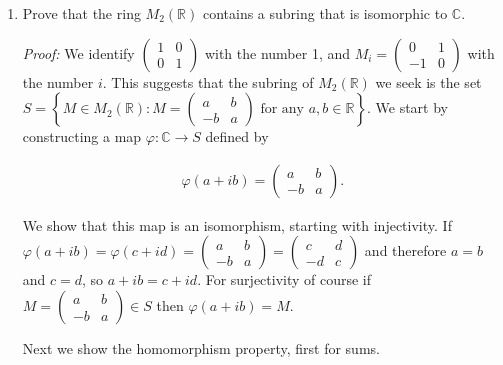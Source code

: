 \documentclass[11pt]{article}
\begin{document}
\begin{enumerate}
{\bf Part (c)}  {\it Proof:} Let $p(x)\in I$ and $q(x)\in R$.  Then $q(0)p(0) = q(0)\cdot 0 = 0$ and therefore $q(x)p(x) \in I$.  Moreover, $I$ is a subgroup since it is a subset closed under sums and inverses: If $r(x)\in I$ then $p(0)+r(0)=0+0=0$ and $p(0)-p(0)=0-0=0$.  And it is a subring because it is closed under products, which is immediate from the property established at the start of this paragraph.  Hence $I$ is an ideal. $\Box$

\item Prove that the ring $M_2(\mathbb{R})$ contains a subring that is isomorphic to $\mathbb{C}$.

{\it Proof:} We identify $\begin{pmatrix} 1 & 0 \\ 0 & 1\end{pmatrix}$ with the number 1, and $M_i = \begin{pmatrix}
	0 & 1 \\ -1 & 0
\end{pmatrix}$ with the number $i$.  This suggests that the subring of $M_2(\mathbb R)$ we seek is the set $S = \left\{M\in M_2(\mathbb R): M=\begin{pmatrix}
	a & b \\ -b & a
\end{pmatrix} \text{ for any } a,b\in \mathbb R\right\}$.  We start by constructing a map $\varphi:\mathbb C\to S$ defined by

\begin{align*}
	\varphi(a+ib)=\begin{pmatrix}
		a & b \\ -b & a
	\end{pmatrix}.
\end{align*}

We show that this map is an isomorphism, starting with injectivity.  If $\varphi(a+ib)=\varphi(c+id)=\begin{pmatrix}
	a & b \\ -b & a
\end{pmatrix} = \begin{pmatrix}
	c & d \\ -d & c
\end{pmatrix}$ and therefore $a=b$ and $c=d$, so $a+ib=c+id$.  For surjectivity of course if $M=\begin{pmatrix}
	a & b \\ -b & a
\end{pmatrix}\in S$ then $\varphi(a+ib)=M$.

Next we show the homomorphism property, first for sums.


\end{enumerate}
\end{document}
